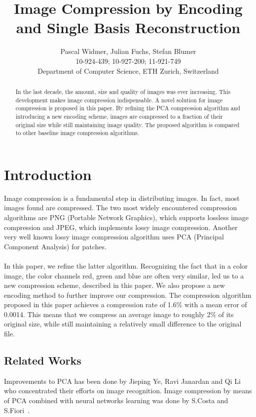 \documentclass[10pt,conference,compsocconf]{IEEEtran}
\begin{document}
\title{Image Compression by Encoding and Single Basis Reconstruction}

\author{
  Pascal Widmer, Julian Fuchs, Stefan Blumer\\
  10-924-439; 10-927-200; 11-921-749\\
  Department of Computer Science, ETH Zurich, Switzerland
}

\maketitle

\begin{abstract}
In the last decade, the amount, size and quality of images was ever increasing. This development makes image compression indispensable. A novel solution for image compression is proposed in this paper. By refining the PCA compression algorithm and introducing a new encoding scheme, images are compressed to a fraction of their original size while still maintaining image quality. The proposed algorithm is compared to other baseline image compression algorithms.
\end{abstract}

\section{Introduction}
Image compression is a fundamental step in distributing images. In fact, most images found are compressed. The two most widely encountered compression algorithms are PNG (Portable Network Graphics), which supports lossless image compression and JPEG, which implements lossy image compression. Another very well known lossy image compression algorithm uses PCA (Principal Component Analysis) for patches.
\\
\\
In this paper, we refine the latter algorithm. Recognizing the fact that in a color image, the color channels red, green and blue are often very similar, led us to a new compression scheme, described in this paper. We also propose a new encoding method to further improve our compression. The compression algorithm proposed in this paper achieves a compression rate of 1.6\% with a mean error of 0.0014. This means that we compress an average image to roughly 2\% of its original size, while still maintaining a relatively small difference to the original file.
\subsection{Related Works}
Improvements to PCA has been done by Jieping Ye, Ravi Janardan and Qi Li~\cite{neural} who concentrated their efforts on image recognition. Image compression by means of PCA combined with neural networks learning was done by S.Costa and S.Fiori~\cite{GPCA}.
\end{document}
